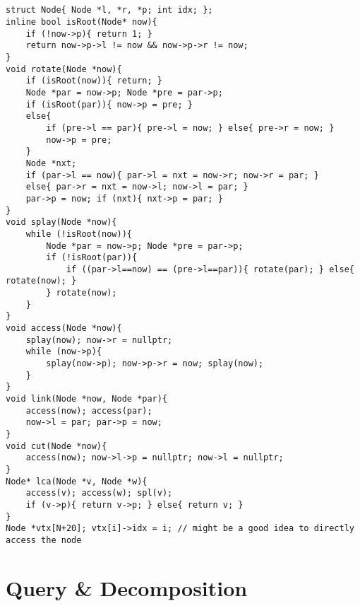 \documentclass[landscape, 8pt, a4paper, oneside, twocolumn]{extarticle}
\begin{document}
\subsection{}
\begin{verbatim}
struct Node{ Node *l, *r, *p; int idx; };
inline bool isRoot(Node* now){
    if (!now->p){ return 1; }
    return now->p->l != now && now->p->r != now;
}
void rotate(Node *now){
    if (isRoot(now)){ return; }
    Node *par = now->p; Node *pre = par->p;
    if (isRoot(par)){ now->p = pre; }
    else{
        if (pre->l == par){ pre->l = now; } else{ pre->r = now; }
        now->p = pre;
    }
    Node *nxt;
    if (par->l == now){ par->l = nxt = now->r; now->r = par; }
    else{ par->r = nxt = now->l; now->l = par; }
    par->p = now; if (nxt){ nxt->p = par; }
}
void splay(Node *now){
    while (!isRoot(now)){
        Node *par = now->p; Node *pre = par->p;
        if (!isRoot(par)){
            if ((par->l==now) == (pre->l==par)){ rotate(par); } else{ rotate(now); }
        } rotate(now);
    }
}
void access(Node *now){
    splay(now); now->r = nullptr;
    while (now->p){
        splay(now->p); now->p->r = now; splay(now);
    }
}
void link(Node *now, Node *par){
    access(now); access(par);
    now->l = par; par->p = now;
}
void cut(Node *now){
    access(now); now->l->p = nullptr; now->l = nullptr;
}
Node* lca(Node *v, Node *w){
    access(v); access(w); spl(v);
    if (v->p){ return v->p; } else{ return v; }
}
Node *vtx[N+20]; vtx[i]->idx = i; // might be a good idea to directly access the node
\end{verbatim}
\section{Query \& Decomposition}
\end{document}
